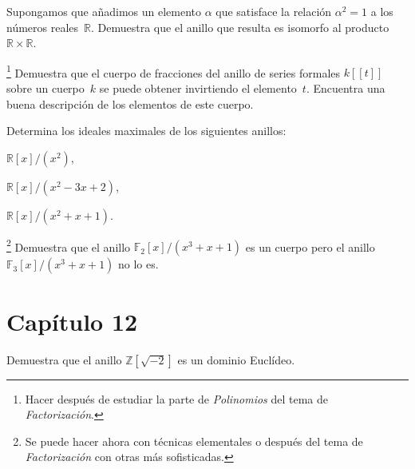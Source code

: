 \documentclass[12pt]{article}
\begin{document}
    
    \begin{exercise}[11.6.5]
        Supongamos que añadimos un elemento $\alpha$ que satisface la relación $\alpha^{2}=1$ a los números reales~$\mathbb{R}$. Demuestra que el anillo que resulta es isomorfo al producto~$\mathbb{R}\times \mathbb{R}$.
    \end{exercise}
    
    
    \begin{exercise}[11.7.4]\hspace{-4mm}\footnote{Hacer después de estudiar la parte de \emph{Polinomios} del tema de \emph{Factorización}.}
        Demuestra que el cuerpo de fracciones del anillo de series formales $k[\![t]\!]$ sobre un cuerpo~$k$ se puede obtener invirtiendo el elemento~$t$. Encuentra una buena descripción de los elementos de este cuerpo.
    \end{exercise}
    
    
    \begin{exercise}[11.8.2]
        Determina los ideales maximales de los siguientes anillos:
        
        \noindent
        \begin{inparaenum}[\bfseries (a)]
            \setcounter{enumi}{1}\item $\mathbb{R}[x]/(x^{2})$,
            \item $\mathbb{R}[x]/(x^{2}-3x+2)$,
            \item $\mathbb{R}[x]/(x^{2}+x+1)$.
        \end{inparaenum}
        
    \end{exercise}
    
    \begin{exercise}[11.8.3]\hspace{-4mm}\footnote{Se puede hacer ahora con técnicas elementales o después del tema de \emph{Factorización} con otras más sofisticadas.}
        Demuestra que el anillo $\mathbb{F}_{2}[x]/(x^{3}+x+1)$ es un cuerpo pero el anillo $\mathbb{F}_{3}[x]/(x^{3}+x+1)$ no lo es.
    \end{exercise}
    
    
    \section*{Capítulo 12}
    
    \begin{exercise}[2.6.b]
        Demuestra que el anillo $\mathbb{Z}[\sqrt{-2}]$ es un dominio Euclídeo.
    \end{exercise}
    
\end{document}
